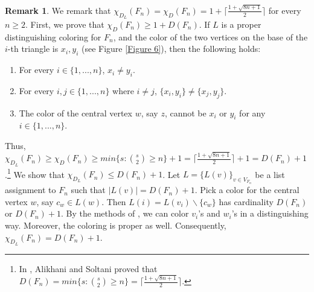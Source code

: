 \documentclass[12pt,reqno,a4paper]{amsart}
\theoremstyle{definition}
\newtheorem{remark}[defn]{Remark}
\begin{document}
\begin{remark}\label{Remark 5.12}
We remark that 
$\chi_{D_{L}}(F_{n}) = \chi_{D}(F_{n}) = 1+\lceil\frac{1+\sqrt{8n+1}}{2}\rceil$ for every $n\geq 2$.
First, we prove that $\chi_{D}(F_{n})\geq 1+D(F_{n})$. If $L$ is a proper distinguishing coloring for $F_{n}$, and the color of the two vertices on the base of the $i$-th triangle is $x_{i}, y_{i}$ (see Figure \ref{Figure 6}), then the following holds:

\begin{enumerate}
    \item For every $i\in \{1,...,n\}$, $x_{i}\neq y_{i}$.
    \item For every $i,j \in \{1,...,n\}$ where $i\neq j$, $\{x_{i}, y_{i}\}\neq \{x_{j}, y_{j}\}$.
    \item The color of the central vertex $w$, say $z$, cannot be $x_{i}$ or $y_{i}$ for any $i\in \{1,...,n\}$.
\end{enumerate}

Thus, $\chi_{D_{L}}(F_{n})\geq\chi_{D}(F_{n})\geq min\{s:\binom{s}{2}\geq n\}+1=\lceil\frac{1+\sqrt{8n+1}}{2}\rceil+1=D(F_{n})+1$.\footnote{In \cite{AS2017}, Alikhani and Soltani proved that $D(F_{n})=min\{s:\binom{s}{2}\geq n\}=\lceil\frac{1+\sqrt{8n+1}}{2}\rceil$.} 
We show that $\chi_{D_{L}}(F_{n})\leq D(F_{n})+1$. 
Let $L=\{L(v)\}_{v\in V_{F_{n}}}$ be a list assignment to $F_{n}$ such that $\vert L(v)\vert =D(F_{n})+1$. Pick a color for the central vertex $w$, say $c_{w}\in L(w)$. Then $L(i)=L(v_{i})\backslash \{c_{w}\} $ has cardinality $D(F_{n})$ or $D(F_{n})+1$. By the methods of \cite{AS}, we can color $v_{i}$'s and $w_{i}$'s in a distinguishing way. Moreover, the coloring is proper as well. Consequently, $\chi_{D_{L}}(F_{n})=D(F_{n})+1$.  


\begin{figure}[!ht]\label{Figure 6-first}

\centering
\begin{minipage}{\textwidth}
\centering
{}
\end{minipage}
\end{figure}
\end{remark}
\end{document}
